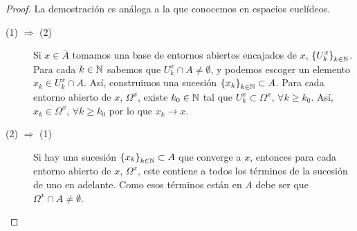 \begin{proof}
La demostración es análoga a la que conocemos en espacios euclídeos.
\begin{description}
	\item[(1) $\displaystyle \Rightarrow $ (2)] Si $\displaystyle x \in \overline{A} $ tomamos una base de entornos abiertos encajados de $\displaystyle x $, $\displaystyle \left\{ U^{x}_{k}\right\} _{k\in \mathbb{N}} $. Para cada $\displaystyle k \in \mathbb{N} $ sabemos que $\displaystyle U^{x}_{k}\cap A\neq \emptyset $, y podemos escoger un elemento $\displaystyle x_{k}\in U^{x}_{k}\cap A $. Así, construimos una sucesión $\displaystyle \left\{ x_{k}\right\} _{k\in \mathbb{N}}\subset A $. 
	Para cada entorno abierto de $\displaystyle x $, $\displaystyle \Omega ^{x} $, existe $\displaystyle k_{0}\in \mathbb{N} $ tal que $\displaystyle U^{x}_{k}\subset \Omega ^{x} $, $\displaystyle \forall k \geq k_{0} $. Así, $\displaystyle x_{k}\in \Omega ^{x} $, $\displaystyle \forall k \geq k_{0} $ por lo que $\displaystyle x_{k}\to x $. 
\item[(2) $\displaystyle \Rightarrow $ (1)] Si hay una sucesión $\displaystyle \left\{ x_{k}\right\} _{k \in \mathbb{N}}\subset A $ que converge a $\displaystyle x $, entonces para cada entorno abierto de $\displaystyle x $, $\displaystyle \Omega ^{x} $, este contiene a todos los términos de la sucesión de uno en adelante. Como esos términos están en $\displaystyle A $ debe ser que $\displaystyle \Omega^{x}\cap A \neq \emptyset $.
\end{description}
\end{proof}

